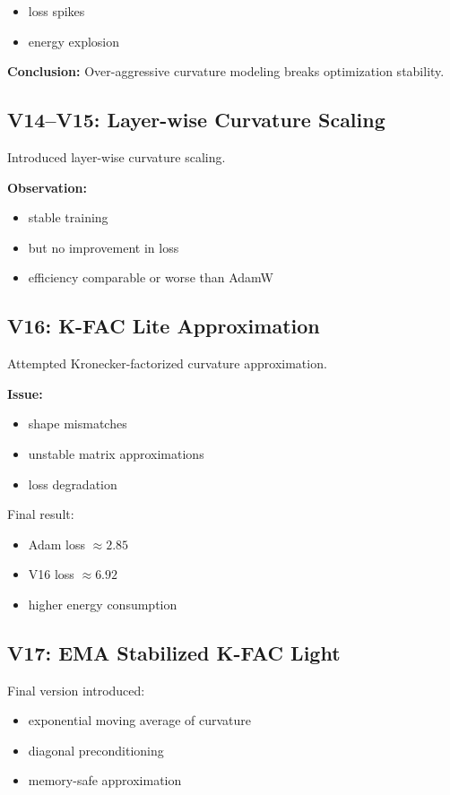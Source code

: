 \documentclass{article}
\begin{document}
\begin{itemize}
    \item loss spikes
    \item energy explosion
\end{itemize}

\textbf{Conclusion:}
Over-aggressive curvature modeling breaks optimization stability.

\subsection{V14–V15: Layer-wise Curvature Scaling}

Introduced layer-wise curvature scaling.

\textbf{Observation:}
\begin{itemize}
    \item stable training
    \item but no improvement in loss
    \item efficiency comparable or worse than AdamW
\end{itemize}

\subsection{V16: K-FAC Lite Approximation}

Attempted Kronecker-factorized curvature approximation.

\textbf{Issue:}
\begin{itemize}
    \item shape mismatches
    \item unstable matrix approximations
    \item loss degradation
\end{itemize}

Final result:

\begin{itemize}
    \item Adam loss $\approx 2.85$
    \item V16 loss $\approx 6.92$
    \item higher energy consumption
\end{itemize}

\subsection{V17: EMA Stabilized K-FAC Light}

Final version introduced:
\begin{itemize}
    \item exponential moving average of curvature
    \item diagonal preconditioning
    \item memory-safe approximation
\end{itemize}
\end{document}
